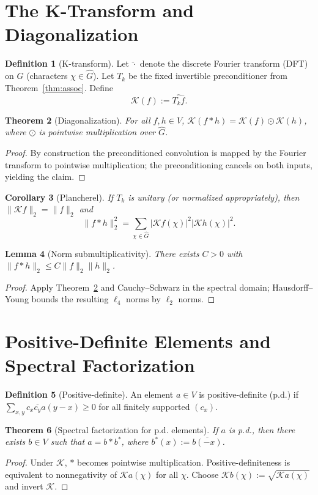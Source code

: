 \documentclass[11pt]{article}
\theoremstyle{plain}
\newtheorem{theorem}{Theorem}[section]
\newtheorem{lemma}[theorem]{Lemma}
\newtheorem{corollary}[theorem]{Corollary}
\theoremstyle{definition}
\newtheorem{definition}[theorem]{Definition}
\theoremstyle{remark}
\begin{document}
\section{The K-Transform and Diagonalization}
\begin{definition}[K-transform]
Let $\widehat{\cdot}$ denote the discrete Fourier transform (DFT) on $G$ (characters $\chi \in \widehat{G}$). Let $T_k$ be the fixed invertible preconditioner from Theorem~\ref{thm:assoc}. Define
\[
    \mathcal{K}(f) := \widehat{T_k f}.
\]
\end{definition}
\begin{theorem}[Diagonalization]\label{thm:diag}
For all $f,h \in V$, $\mathcal{K}(f \ast h) = \mathcal{K}(f) \odot \mathcal{K}(h)$, where $\odot$ is pointwise multiplication over $\widehat{G}$.
\end{theorem}
\begin{proof}
By construction the preconditioned convolution is mapped by the Fourier transform to pointwise multiplication; the preconditioning cancels on both inputs, yielding the claim.
\end{proof}
\begin{corollary}[Plancherel]
If $T_k$ is unitary (or normalized appropriately), then $\lVert \mathcal{K}f \rVert_2 = \lVert f \rVert_2$ and
\[
    \lVert f \ast h \rVert_2^2 = \sum_{\chi \in \widehat{G}} |\mathcal{K}f(\chi)|^2 |\mathcal{K}h(\chi)|^2.
\]
\end{corollary}
\begin{lemma}[Norm submultiplicativity]
There exists $C > 0$ with $\lVert f \ast h \rVert_2 \le C \lVert f \rVert_2 \lVert h \rVert_2$.
\end{lemma}
\begin{proof}
Apply Theorem~\ref{thm:diag} and Cauchy--Schwarz in the spectral domain; Hausdorff--Young bounds the resulting $\ell_4$ norms by $\ell_2$ norms.
\end{proof}
\section{Positive-Definite Elements and Spectral Factorization}
\begin{definition}[Positive-definite]
An element $a \in V$ is positive-definite (p.d.) if $\sum_{x,y} c_x \overline{c_y} a(y-x) \ge 0$ for all finitely supported $(c_x)$.
\end{definition}
\begin{theorem}[Spectral factorization for p.d. elements]\label{thm:bochner}
If $a$ is p.d., then there exists $b \in V$ such that $a = b \ast b^{\ast}$, where $b^{\ast}(x) := \overline{b(-x)}$.
\end{theorem}
\begin{proof}
Under $\mathcal{K}$, $\ast$ becomes pointwise multiplication. Positive-definiteness is equivalent to nonnegativity of $\mathcal{K}a(\chi)$ for all $\chi$. Choose $\mathcal{K}b(\chi) := \sqrt{\mathcal{K}a(\chi)}$ and invert $\mathcal{K}$.
\end{proof}
\end{document}
